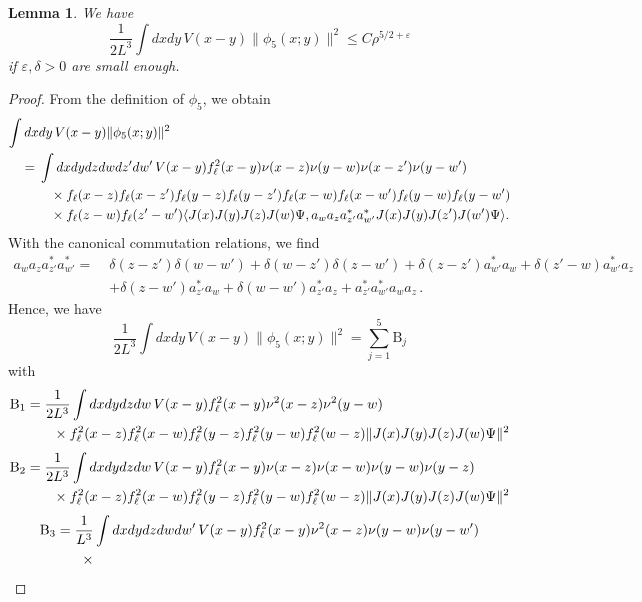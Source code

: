 \documentclass[a4paper,11pt]{article}
\def\eps{\varepsilon}
\newtheorem{lemma}[theorem]{Lemma}
\numberwithin{equation}{section}
\begin{document}
\begin{lemma} \label{lm:phi5} 
We have 
\[ \frac{1}{2L^3} \int dx dy \, V(x-y) \| \phi_5 (x;y) \|^2 \leq C \rho^{5/2+\eps} \]
if $\eps, \delta > 0$ are small enough.
\end{lemma} 
\begin{proof} 
From the definition of $\phi_5$, we obtain 
\[ \begin{split}  \int dx &dy \, V(x-y) \| \phi_5 (x;y) \|^2 \\ = \; & \int dx dy dz dw dz' dw' \, V(x-y) f_\ell^2 (x-y) \nu (x-z) \nu (y-w) \nu (x-z') \nu (y-w') \\ &\hspace{.3cm} \times f_\ell(x-z) f_\ell(x-z') f_\ell(y-z)  f_\ell(y-z') f_\ell(x-w)  f_\ell(x-w') f_\ell(y-w) f_\ell(y-w')  \\ &\hspace{.3cm} \times   f_\ell(z-w)f_\ell(z'-w') \langle J(x) J(y) J(z) J(w) \Psi, a_w a_z  a^*_{z'} a_{w'}^*  J(x) J(y) J(z') J(w') \Psi \rangle . \end{split} \] 
With the canonical commutation relations, we find 
\[ \begin{split} a_w a_z a_{z'}^* a^*_{w'} = \; &\delta (z-z') \delta (w-w') + \delta (w-z') \delta (z-w') + \delta (z-z') a_{w'}^* a_w + \delta (z'-w) a_{w'}^* a_z \\ &+ \delta (z-w') a_{z'}^* a_w + \delta (w-w') a_{z'}^* a_z + a_{z'}^* a_{w'}^* a_w a_z \,. \end{split} \]
Hence, we have 
\[ \frac{1}{2L^3} \int dx dy \, V(x-y) \| \phi_5 (x;y) \|^2 = \sum_{j=1}^5 \text{B}_j  \]
with 
\[ \begin{split} \text{B}_1 = \; &\frac{1}{2L^3} \int dx dy dz dw \, V(x-y) f_\ell^2 (x-y) \nu^2 (x-z)  \nu^2 (y-w)\\ &\hspace{.2cm} \times    f_\ell^2 (x-z) f_\ell^2 (x-w)  f_\ell^2 (y-z) f_\ell^2 (y-w)  f_\ell^2 (w-z) \| J(x) J(y) J(z) J(w) \Psi \|^2 \end{split} \]
\[ \begin{split} \text{B}_2 = \; &\frac{1}{2L^3} \int dx dy dz dw \,  V(x-y) f_\ell^2 (x-y) \nu (x-z) \nu (x-w) \nu (y-w) \nu (y-z) \\ &\hspace{.2cm} \times f_\ell^2 (x-z) f_\ell^2 (x-w)  f_\ell^2 (y-z) f_\ell^2 (y-w)  f_\ell^2 (w-z) \| J(x) J(y) J(z) J(w) \Psi \|^2 \end{split} \]
\[ \begin{split} \text{B}_3 =  \; &\frac{1}{L^3} \int dx dy dz dw dw' \, V(x-y) f_\ell^2 (x-y) \nu^2 (x-z) \nu (y-w) \nu (y-w') \\ &\hspace{.2cm} \times 

\end{split}\]
\end{proof}
\end{document}
